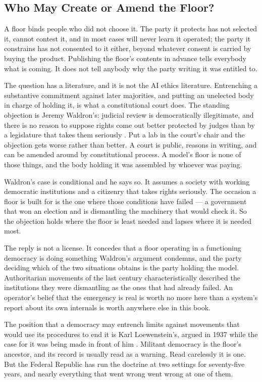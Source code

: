 \subsection{Who May Create or Amend the Floor?}
\label{sec:create-amend}
A floor binds people who did not choose it. The party it protects has not selected it, cannot contest it, and in most cases will never learn it operated; the party it constrains has not consented to it either, beyond whatever consent is carried by buying the product. Publishing the floor's contents in advance tells everybody what is coming. It does not tell anybody why the party writing it was entitled to.

The question has a literature, and it is not the AI ethics literature. Entrenching a substantive commitment against later majorities, and putting an unelected body in charge of holding it, is what a constitutional court does. The standing objection is Jeremy Waldron's: judicial review is democratically illegitimate, and there is no reason to suppose rights come out better protected by judges than by a legislature that takes them seriously \autocite{waldron2006core}. Put a lab in the court's chair and the objection gets worse rather than better. A court is public, reasons in writing, and can be amended around by constitutional process. A model's floor is none of those things, and the body holding it was assembled by whoever was paying.

Waldron's case is conditional and he says so. It assumes a society with working democratic institutions and a citizenry that takes rights seriously. The occasion a floor is built for is the one where those conditions have failed — a government that won an election and is dismantling the machinery that would check it. So the objection holds where the floor is least needed and lapses where it is needed most.

The reply is not a license. It concedes that a floor operating in a functioning democracy is doing something Waldron's argument condemns, and the party deciding which of the two situations obtains is the party holding the model. Authoritarian movements of the last century characteristically described the institutions they were dismantling as the ones that had already failed. An operator's belief that the emergency is real is worth no more here than a system's report about its own internals is worth anywhere else in this book.

The position that a democracy may entrench limits against movements that would use its procedures to end it is Karl Loewenstein's, argued in 1937 while the case for it was being made in front of him \autocite{loewenstein1937militant}. Militant democracy is the floor's ancestor, and its record is usually read as a warning. Read carelessly it is one. But the Federal Republic has run the doctrine at two settings for seventy-five years, and nearly everything that went wrong went wrong at one of them.

